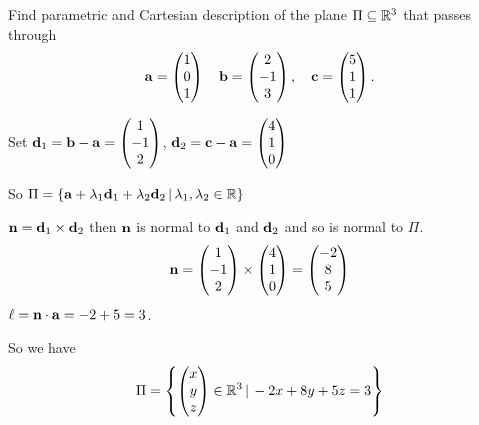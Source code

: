 \documentclass[10pt, a4paper]{article}
\begin{document}
\begin{example}
    Find parametric and Cartesian description of the plane $\Pi \subseteq \mathbb{R} ^ 3$ that passes through
    \[
    \mathbf{a} = \begin{pmatrix}
        1 \\ 0 \\ 1
    \end{pmatrix}
    \quad
    \mathbf{b} = \begin{pmatrix}
        2 \\ -1 \\ 3
    \end{pmatrix},
    \quad
    \mathbf{c} = \begin{pmatrix}
        5 \\ 1 \\ 1
    \end{pmatrix}.
    \]

    Set $\mathbf{d}_1 = \mathbf{b - a} = \begin{pmatrix}
        1 \\ -1 \\ 2
    \end{pmatrix}$, $\mathbf{d}_2 = \mathbf{c - a} = \begin{pmatrix}
        4 \\ 1 \\ 0
    \end{pmatrix}$

    So $\Pi = \{\mathbf{a} + \lambda_1 \mathbf{d}_1 + \lambda_2 \mathbf{d}_2\,|\, \lambda_1, \lambda_2 \in \mathbb{R}\}$

    $\mathbf{n} = \mathbf{d}_1 \times \mathbf{d}_2$ then $\mathbf{n}$ is normal to $\mathbf{d}_1$ and $\mathbf{d}_2$ and so is normal to $\Pi$.
    \[
    \mathbf{n} = \begin{pmatrix}
        1 \\ -1 \\ 2
    \end{pmatrix}
    \times \begin{pmatrix}
        4 \\ 1 \\ 0
    \end{pmatrix}
    =
    \begin{pmatrix}
        -2 \\ 8 \\ 5
    \end{pmatrix}
    \]
    $\ell = \mathbf{n \cdot a} = -2 + 5 = 3$.

    So we have
    \[
    \Pi = \left\{\begin{pmatrix}
        x \\ y \\ z
    \end{pmatrix} \in \mathbb{R} ^ 3\,|\, -2x + 8y + 5z = 3\right\}
    \]
\end{example}
\end{document}
